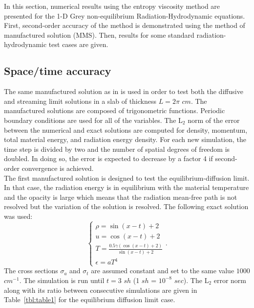 \documentclass[review]{elsarticle}
\newcommand{\tbl}[1]{Table~\ref{#1}}                     %
\begin{document}
In this section, numerical results using the entropy viscosity method are presented for the 1-D Grey non-equilibrium Radiation-Hydrodynamic equations. First, second-order accuracy of the method is demonstrated using the method of manufactured solution (MMS). Then, results for some standard radiation-hydrodynamic test cases are given. 

\subsection{Space/time accuracy}
\label{sec:MMS}

The same manufactured solution as in \cite{EdwardsMorelLowrie} is used in order to test both the diffusive and streaming limit solutions in a slab of thickness $L=2 \pi$ $cm$. The manufactured solutions are composed of trigonometric functions. Periodic boundary conditions are used for all of the variables. The L$_2$ norm of the error between the numerical and exact solutions are computed for density, momentum, total material energy, and radiation energy density. For each new simulation, the time step is divided by two and the  number of spatial degrees of freedom is doubled. In doing so, the error is expected to decrease by a factor 4 if second-order convergence is achieved. \\
The first manufactured solution is designed to test the equilibrium-diffusion limit. In that case, the radiation energy is in equilibrium with the material temperature and the opacity is large which means that the radiation mean-free path is not resolved but the variation of the solution is resolved. The following exact solution was used:
\begin{equation}
\label{eq:equation13}
\left\{
\begin{array}{llll}
\rho = \sin (x-t)+2 \\
u = \cos(x-t) +2 \\
T = \frac{0.5 \gamma (\cos(x-t) +2) }{\sin (x-t)+2}\\
\epsilon = a T^4
\end{array}
\right. .
\end{equation}
The cross sections $\sigma_a$ and $\sigma_t$ are assumed constant and set to the same value $1000$ $cm^{-1}$. The simulation is run until $t=3$ $sh$
(1 $sh$ = $10^{-8}$ $sec$). The L$_2$ error norm along with its ratio between consecutive simulations are given in \tbl{tbl:table1} for the equilibrium diffusion limit case.
\end{document}
